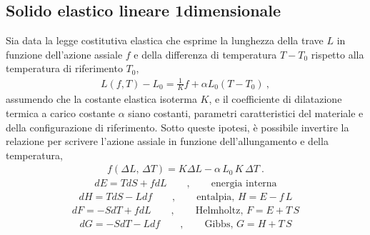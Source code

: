 \documentclass[letterpaper,10pt,italian]{jupyterBook}
\begin{document}
\subsection{Solido elastico lineare 1\sphinxhyphen{}dimensionale}
\label{\detokenize{ch/thermodynamics/elastic-solid-1d:solido-elastico-lineare-1-dimensionale}}\label{\detokenize{ch/thermodynamics/elastic-solid-1d:physics-hs-thermodynamics-matter-elastic-1d-constitutive-equation}}
\sphinxAtStartPar
{}
Sia data la legge costitutiva elastica che esprime la lunghezza della trave \(L\) in funzione dell’azione assiale \(f\) e della differenza di temperatura \(T-T_0\) rispetto alla temperatura di riferimento \(T_0\),
\begin{equation*}
\begin{split}L(f,T) - L_0 = \frac{1}{K} f + \alpha L_0 (T-T_0) \ ,\end{split}
\end{equation*}
\sphinxAtStartPar
assumendo che la costante elastica isoterma \(K\), e il coefficiente di dilatazione termica a carico costante \(\alpha\) siano costanti, parametri caratteristici del materiale e della configurazione di riferimento. Sotto queste ipotesi, è possibile invertire la relazione per scrivere l’azione assiale in funzione dell’allungamento e della temperatura,
\begin{equation*}
\begin{split}f(\Delta L, \, \Delta T) = K \Delta L - \alpha \, L_0 \, K \, \Delta T \ .\end{split}
\end{equation*}
\sphinxAtStartPar
{}
\begin{equation*}
\begin{split}dE = T dS + f dL  \qquad , \qquad \text{energia interna} \end{split}
\end{equation*}\begin{equation*}
\begin{split}dH = T dS - L df  \qquad , \qquad \text{entalpia, $H = E - f \, L$} \end{split}
\end{equation*}\begin{equation*}
\begin{split}dF =-S dT + f dL  \qquad , \qquad \text{Helmholtz, $F = E + T \, S$} \end{split}
\end{equation*}\begin{equation*}
\begin{split}dG =-S dT - L df  \qquad , \qquad \text{Gibbs, $G = H + T \, S$} \end{split}
\end{equation*}
\end{document}
